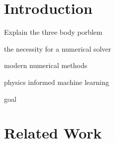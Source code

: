 \documentclass[draft]{agujournal2019}
\begin{document}
%


%
%
%
%


\section{Introduction}
Explain the three body porblem \cite{heggie2005classicalgravitationalnbodyproblem}

the necessity for a numerical solver

modern numerical methods

physics informed machine learning

goal

\section{Related Work}
\end{document}
